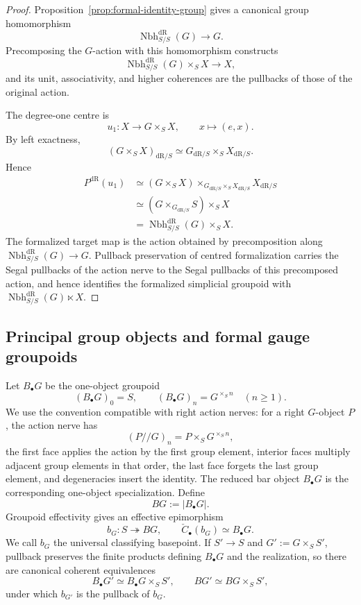 \begin{proof}
Proposition~\ref{prop:formal-identity-group} gives a canonical group
homomorphism
\[
    \operatorname{Nbh}^{\mathrm{dR}}_{S/S}(G)\longrightarrow G.
\]
Precomposing the $G$-action with this homomorphism constructs
\[
    \operatorname{Nbh}^{\mathrm{dR}}_{S/S}(G)\times_SX\longrightarrow X,
\]
and its unit, associativity, and higher coherences are the pullbacks of those
of the original action.

The degree-one centre is
\[
    u_1:X\longrightarrow G\times_SX,
    \qquad
    x\longmapsto(e,x).
\]
By left exactness,
\[
    (G\times_SX)_{\mathrm{dR}/S}
    \simeq
    G_{\mathrm{dR}/S}
    \times_S
    X_{\mathrm{dR}/S}.
\]
Hence
\[
\begin{aligned}
    P^{\mathrm{dR}}(u_1)
    &\simeq
    (G\times_SX)
    \times_{
        G_{\mathrm{dR}/S}\times_SX_{\mathrm{dR}/S}
    }
    X_{\mathrm{dR}/S}\\
    &\simeq
    \left(
        G\times_{G_{\mathrm{dR}/S}}S
    \right)
    \times_SX\\
    &=
    \operatorname{Nbh}^{\mathrm{dR}}_{S/S}(G)\times_SX.
\end{aligned}
\]
The formalized target map is the action obtained by precomposition along
$\operatorname{Nbh}^{\mathrm{dR}}_{S/S}(G)\to G$.  Pullback preservation of centred
formalization carries the Segal pullbacks of the action nerve to the Segal
pullbacks of this precomposed action, and hence identifies the formalized
simplicial groupoid with $\operatorname{Nbh}^{\mathrm{dR}}_{S/S}(G)\ltimes X$.
\end{proof}

\subsection{Principal group objects and formal gauge groupoids}

\begin{definition}
\label{def:classifying-object-group}
Let $B_\bullet G$ be the one-object groupoid
\[
    (B_\bullet G)_0=S,
    \qquad
    (B_\bullet G)_n=G^{\times_Sn}\quad(n\geq1).
\]
We use the convention compatible with right action nerves: for a right
$G$-object $P$, the action nerve has
\[
    (P/\!/G)_n=P\times_SG^{\times_Sn},
\]
the first face applies the action by the first group element, interior faces
multiply adjacent group elements in that order, the last face forgets the
last group element, and degeneracies insert the identity.  The reduced bar
object $B_\bullet G$ is the corresponding one-object specialization.  Define
\[
    BG:=|B_\bullet G|.
\]
Groupoid effectivity gives an effective epimorphism
\[
    b_G:S\twoheadrightarrow BG,
    \qquad
    \check C_\bullet(b_G)\simeq B_\bullet G.
\]
We call $b_G$ the universal classifying basepoint.  If $S'\to S$ and
$G':=G\times_SS'$, pullback preserves the finite products defining
$B_\bullet G$ and the realization, so there are canonical coherent
equivalences
\[
    B_\bullet G'\simeq B_\bullet G\times_SS',
    \qquad
    BG'\simeq BG\times_SS',
\]
under which $b_{G'}$ is the pullback of $b_G$.
\end{definition}

